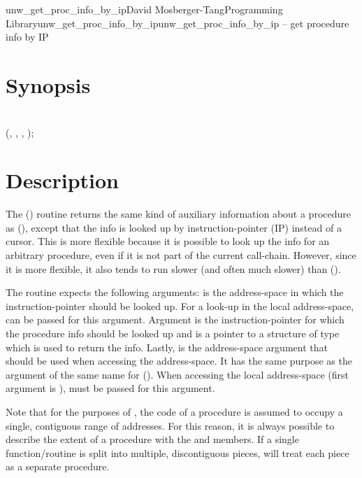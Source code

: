 \documentclass{article}
\begin{document}
\begin{Name}{3}{unw\_get\_proc\_info\_by\_ip}{David Mosberger-Tang}{Programming Library}{unw\_get\_proc\_info\_by\_ip}unw\_get\_proc\_info\_by\_ip -- get procedure info by IP
\end{Name}

\section{Synopsis}

\\

 (, , , );\\

\section{Description}

The () routine returns the same
kind of auxiliary information about a procedure as
(), except that the info is looked up by
instruction-pointer (IP) instead of a cursor.  This is more flexible
because it is possible to look up the info for an arbitrary procedure,
even if it is not part of the current call-chain.  However, since it
is more flexible, it also tends to run slower (and often much slower)
than ().

The routine expects the following arguments:  is the
address-space in which the instruction-pointer should be looked up.
For a look-up in the local address-space,
 can be passed for this argument.
Argument  is the instruction-pointer for which the procedure
info should be looked up and  is a pointer to a structure of
type  which is used to return the info.
Lastly,  is the address-space argument that should be used
when accessing the address-space.  It has the same purpose as the
argument of the same name for ().  When
accessing the local address-space (first argument is
),  must be passed for this
argument.

Note that for the purposes of , the code of a
procedure is assumed to occupy a single, contiguous range of
addresses.  For this reason, it is always possible to describe the
extent of a procedure with the  and 
members.  If a single function/routine is split into multiple,
discontiguous pieces,  will treat each piece as a
separate procedure.
\end{document}
